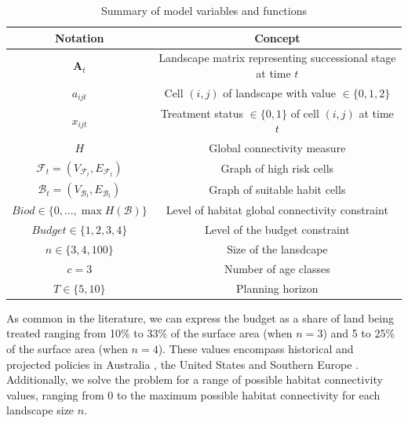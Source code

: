 \begin{table}[h]
\centering
\onehalfspacing
\begin{tabular}{|c|c|}
\hline
Notation & Concept \\
\hline \hline
$\mathbf{A}_t$ & Landscape matrix representing successional stage at time $t$ \\
$a_{ijt}$ & Cell $(i,j)$ of landscape with value $\in \{0,1,2\}$\\ 
$x_{ijt}$ & Treatment status $\in\{0,1\}$ of cell $(i,j)$ at time $t$ \\
$H$ & Global connectivity measure\\
$\mathcal{F}_t = (V_{\mathcal{F}_t}, E_{\mathcal{F}_t})$ & Graph of high risk cells\\
$\mathcal{B}_t = (V_{\mathcal{B}_t}, E_{\mathcal{B}_t})$ & Graph of suitable habit cells\\
\hline \hline
$Biod \in \{0,...,\max H(\mathcal{B})\}$ & Level of habitat global connectivity constraint\\
$Budget \in \{1,2,3,4\}$ & Level of the budget constraint\\
$n \in \{3,4,100\}$ & Size of the lansdcape\\
$c = 3$ & Number of age classes \\
$T \in \{5,10\} $ & Planning horizon\\
\hline 
\end{tabular}
\caption{Summary of model variables and functions}
\end{table}
As common in the literature, we can express the budget as a share of land being treated ranging from 10\% to 33\% of the surface area (when $n=3$) and 5 to 25\% of the surface area (when $n=4$). These values encompass historical and projected policies in Australia \citep{burrows2013}, the United States \citep{GAO2019} and Southern Europe \citep{Fernandes2013}.
\\
Additionally, we solve the problem for a range of possible habitat connectivity values, ranging from $0$ to the maximum possible habitat connectivity for each landscape size $n$.

